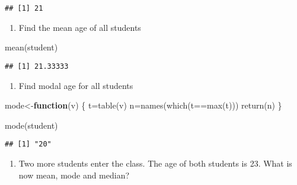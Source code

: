 \documentclass[
]{article}
\newenvironment{Shaded}{\begin{snugshade}}{\end{snugshade}}
\newcommand{\ControlFlowTok}[1]{\textcolor[rgb]{0.13,0.29,0.53}{\textbf{#1}}}
\newcommand{\FunctionTok}[1]{\textcolor[rgb]{0.00,0.00,0.00}{#1}}
\newcommand{\NormalTok}[1]{#1}
\newcommand{\OtherTok}[1]{\textcolor[rgb]{0.56,0.35,0.01}{#1}}
\newcommand{\SpecialCharTok}[1]{\textcolor[rgb]{0.00,0.00,0.00}{#1}}
\providecommand{\tightlist}{%
  \setlength{\itemsep}{0pt}\setlength{\parskip}{0pt}}
\begin{document}
\begin{verbatim}
## [1] 21
\end{verbatim}

\begin{enumerate}
\def\labelenumi{\roman{enumi})}
\setcounter{enumi}{2}
\tightlist
\item
  Find the mean age of all students
\end{enumerate}

\begin{Shaded}
\begin{Highlighting}[]
\FunctionTok{mean}\NormalTok{(student)}
\end{Highlighting}
\end{Shaded}

\begin{verbatim}
## [1] 21.33333
\end{verbatim}

\begin{enumerate}
\def\labelenumi{\roman{enumi})}
\setcounter{enumi}{3}
\tightlist
\item
  Find modal age for all students
\end{enumerate}

\begin{Shaded}
\begin{Highlighting}[]
\NormalTok{mode}\OtherTok{\textless{}{-}}\ControlFlowTok{function}\NormalTok{(v)}
\NormalTok{\{}
\NormalTok{    t}\OtherTok{=}\FunctionTok{table}\NormalTok{(v)}
\NormalTok{    n}\OtherTok{=}\FunctionTok{names}\NormalTok{(}\FunctionTok{which}\NormalTok{(t}\SpecialCharTok{==}\FunctionTok{max}\NormalTok{(t)))}
    \FunctionTok{return}\NormalTok{(n)}
\NormalTok{\}}
\end{Highlighting}
\end{Shaded}

\begin{Shaded}
\begin{Highlighting}[]
\FunctionTok{mode}\NormalTok{(student)}
\end{Highlighting}
\end{Shaded}

\begin{verbatim}
## [1] "20"
\end{verbatim}

\begin{enumerate}
\def\labelenumi{\alph{enumi})}
\setcounter{enumi}{21}
\tightlist
\item
  Two more students enter the class. The age of both students is 23.
  What is now mean, mode and median?
\end{enumerate}
\end{document}
